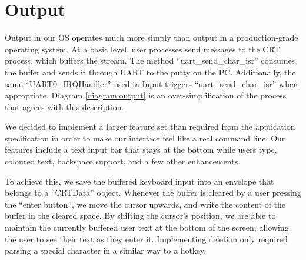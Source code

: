 \documentclass[12pt]{report}
\begin{document}
\section{Output}
    Output in our OS operates much more simply than output in a production-grade
    operating system.
    At a basic level, user processes send messages to the CRT process, which
    buffers the stream. The method ``uart\_send\_char\_isr'' consumes the buffer
    and sends it through UART to the putty on the PC. Additionally, the same
    ``UART0\_IRQHandler'' used in Input triggers ``uart\_send\_char\_isr'' when
    appropriate. Diagram \ref{diagram:output} is an over-simplification of the
    process that agrees with this description.


    We decided to implement a larger feature set than required from the
    application specification in order to make our interface feel like a real
    command line. Our features include a text input bar that stays at the bottom
    while users type, coloured text, backspace support, and a few other
    enhancements.

    To achieve this, we save the buffered keyboard input into an envelope
    that belongs to a ``CRTData'' object. Whenever the buffer is cleared by a
    user pressing the ``enter button'', we move the cursor upwards, and write
    the content of the buffer in the cleared space. By shifting the cursor's
    position, we are able to maintain the currently buffered user text at the
    bottom of the screen, allowing the user to see their text as they enter it.
    Implementing deletion only required parsing a special character in a similar
    way to a hotkey.
\end{document}
